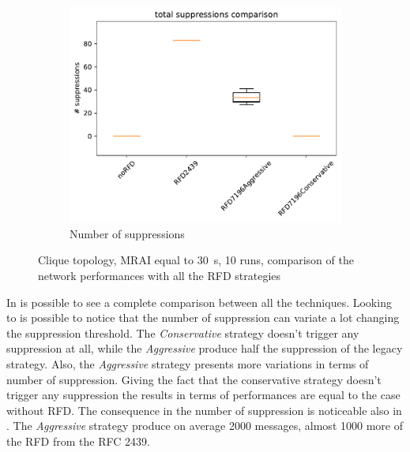 \begin{figure}[h]
\begin{subfigure}[b]{0.49\textwidth}
     \end{subfigure}
     \hfill
     \begin{subfigure}[b]{0.49\textwidth}
         \centering
         \includegraphics[width=\textwidth]{images/RFD/clique/clique_rfd_comparison_suppressions_boxplot.pdf}
         \caption{Number of suppressions}
         \label{fig:RFD_clique_MRAI30_suppressions}
     \end{subfigure}
		\caption{Clique topology, MRAI equal to \SI{30}{\second}, \num{10} runs,
				comparison of the network performances with all the \ac{RFD} strategies}
        \label{fig:RFD_MRAI30}
\end{figure}

In  is possible to see a complete comparison between all
the techniques.
Looking to  is possible to notice that
the number of suppression can variate a lot changing the suppression threshold.
The \textit{Conservative} strategy doesn't trigger any suppression at all, while
the \textit{Aggressive} produce half the suppression of the legacy strategy.
Also, the \textit{Aggressive} strategy presents more variations in terms of
number of suppression.
Giving the fact that the conservative strategy doesn't trigger any suppression
the results in terms of performances are equal to the case without \ac{RFD}.
The consequence in the number of suppression is noticeable also in
.
The \textit{Aggressive} strategy produce on average \num{2000} messages, almost
\num{1000} more of the \ac{RFD} from the \ac{RFC} \num{2439}.


